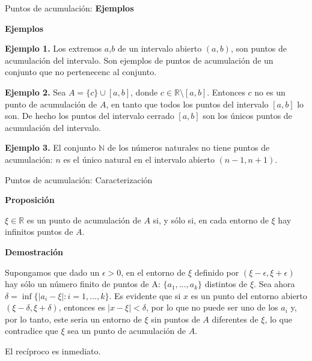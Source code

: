 \documentclass[
  ignorenonframetext,
]{beamer}
\begin{document}
\begin{frame}{Puntos de acumulación: \textbf{Ejemplos}}
\protect\hypertarget{puntos-de-acumulaciuxf3n-ejemplos}{}

\textbf{Ejemplos}

\textbf{Ejemplo 1.} Los extremos \(a\),\(b\) de un intervalo abierto
\((a,b)\), son puntos de acumulación del intervalo. Son ejemplos de
puntos de acumulación de un conjunto que no pertenecenc al conjunto.

\textbf{Ejemplo 2.} Sea \(A=\{c\} \cup [a,b]\), donde
\(c \in \mathbb{R} \setminus [a,b]\). Entonces \(c\) no es un punto de
acumulación de \(A\), en tanto que todos los puntos del intervalo
\([a,b]\) lo son. De hecho los puntos del intervalo cerrado \([a,b]\)
son los únicos puntos de acumulación del intervalo.

\textbf{Ejemplo 3.} El conjunto \(\mathbb{N}\) de los números naturales
no tiene puntos de acumulación: \(n\) es el único natural en el
intervalo abierto \((n-1,n+1)\).

\end{frame}

\begin{frame}{Puntos de acumulación: Caracterización}
\protect\hypertarget{puntos-de-acumulaciuxf3n-caracterizaciuxf3n}{}

\textbf{Proposición}

\(\xi \in \mathbb{R}\) es un punto de acumulación de \(A\) si, y sólo
si, en cada entorno de \(\xi\) hay infinitos puntos de \(A\).

\textbf{Demostración }

Supongamos que dado un \(\epsilon >0\), en el entorno de \(\xi\)
definido por \((\xi - \epsilon, \xi+\epsilon)\) hay sólo un número
finito de puntos de A: \(\{a_1, \ldots, a_k\}\) distintos de \(\xi\).
Sea ahora \(\delta = \inf\{ |a_i-\xi|: i=1,\ldots,k\}\). Es evidente que
si \(x\) es un punto del entorno abierto \((\xi-\delta,\xi+\delta)\),
entonces es \(|x-\xi|<\delta\), por lo que no puede ser uno de los
\(a_i\) y, por lo tanto, este seria un entorno de \(\xi\) sin puntos de
\(A\) diferentes de \(\xi\), lo que contradice que \(\xi\) sea un punto
de acumulación de \(A\).

El recíproco es inmediato.

\end{frame}
\end{document}
